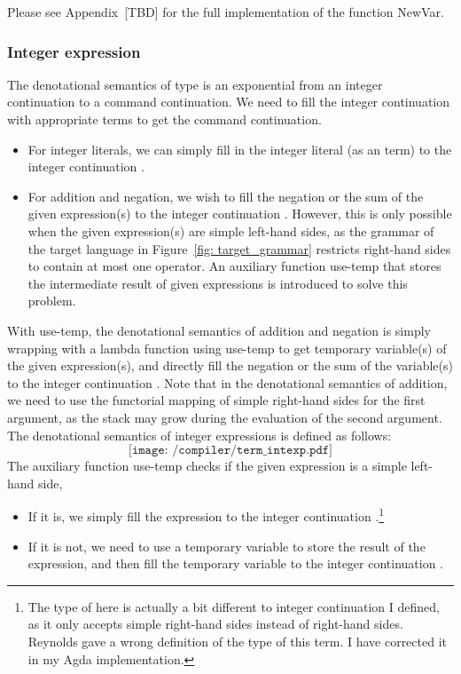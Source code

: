 \documentclass[12pt,a4paper]{report}
\theoremstyle{definition}
\begin{document}
        Please see Appendix~[TBD] for the full implementation of the function \textsf{NewVar}.

        \subsubsection{Integer expression} \label{subsubsec: compiler_intexp}
        The denotational semantics of type  is an exponential from an integer continuation to a command continuation. We need to fill the integer continuation with appropriate  terms to get the command continuation. 
        \begin{itemize}
            \item For integer literals, we can simply fill in the integer literal (as an  term) to the integer continuation \text{\beta}.
            \item For addition and negation, we wish to fill the negation or the sum of the given expression(s) to the integer continuation \text{\beta}. However, this is only possible when the given expression(s) are simple left-hand sides, as the grammar of the target language in Figure~\ref{fig: target_grammar} restricts right-hand sides to contain at most one operator. An auxiliary function \textsf{use-temp} that stores the intermediate result of given expressions is introduced to solve this problem. 
        \end{itemize}
        With \textsf{use-temp}, the denotational semantics of addition and negation is simply wrapping \text{\beta} with a lambda function using \textsf{use-temp} to get temporary variable(s) of the given expression(s), and directly fill the negation or the sum of the variable(s) to the integer continuation \text{\beta}. Note that in the denotational semantics of addition, we need to use the functorial mapping of simple right-hand sides for the first argument, as the stack may grow during the evaluation of the second argument. The denotational semantics of integer expressions is defined as follows:
        \[\texttt{[image: /compiler/term\_intexp.pdf]}\]
        The auxiliary function \textsf{use-temp} checks if the given expression is a simple left-hand side,
        \begin{itemize}
            \item If it is, we simply fill the expression to the integer continuation \text{\beta}.\footnote{The type of \text{\beta} here is actually a bit different to integer continuation I defined, as it only accepts simple right-hand sides instead of right-hand sides. Reynolds gave a wrong definition of the type of this term. I have corrected it in my Agda implementation.}
            \item If it is not, we need to use a temporary variable to store the result of the expression, and then fill the temporary variable to the integer continuation \text{\beta}.
        \end{itemize}
\end{document}
